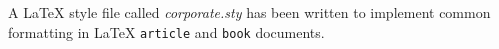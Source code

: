 A LaTeX style file called \emph{corporate.sty} has been written to implement common formatting in LaTeX \texttt{article} and \texttt{book} documents.